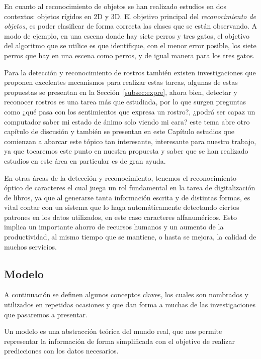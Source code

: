 En cuanto al reconocimiento de objetos se han realizado estudios en dos contextos: objetos rígidos en 2D y 3D\@. El objetivo principal del \textit{reconocimiento de objetos}, es poder clasificar de forma correcta las clases que se están observando. A modo de ejemplo, en una escena donde hay siete perros y tres gatos, el objetivo del algoritmo que se utilice es que identifique, con el menor error posible, los siete perros que hay en una escena como perros, y de igual manera para los tres gatos.

Para la detección y reconocimiento de rostros también existen investigaciones que proponen excelentes mecanismos para realizar estas tareas, algunas de estas propuestas se presentan en la Sección~\ref{subsec:expre}, ahora bien, detectar y reconocer rostros es una tarea más que estudiada, por lo que surgen preguntas como ¿qué pasa con los sentimientos que expresa un rostro?, ¿podrá ser capaz un computador saber mi estado de ánimo solo viendo mi cara? este tema abre otro capítulo de discusión y también se presentan en este Capítulo estudios que comienzan a abarcar este tópico tan interesante, interesante para nuestro trabajo, ya que tocaremos este punto en nuestra propuesta y saber que se han realizado estudios en este área en particular es de gran ayuda.

En otras áreas de la detección y reconocimiento, tenemos el reconocimiento óptico de caracteres el cual juega un rol fundamental en la tarea de digitalización de libros, ya que al generarse tanta información escrita y de distintas formas, es vital contar con un sistema que lo haga automáticamente detectando ciertos patrones en los datos utilizados, en este caso caracteres alfanuméricos. Esto implica un importante ahorro de recursos humanos y un aumento de la productividad, al mismo tiempo que se mantiene, o hasta se mejora, la calidad de muchos servicios.

\subsection{Modelo}
\label{subsec:modelo}
A continuación se definen algunos conceptos claves, los cuales son nombrados y utilizados en repetidas ocasiones y que dan forma a muchas de las investigaciones que pasaremos a presentar.
\begin{definition}[Modelo]
Un modelo es una abstracción teórica del mundo real, que nos permite representar la información de forma simplificada con el objetivo de realizar predicciones con los datos necesarios.
\end{definition}

